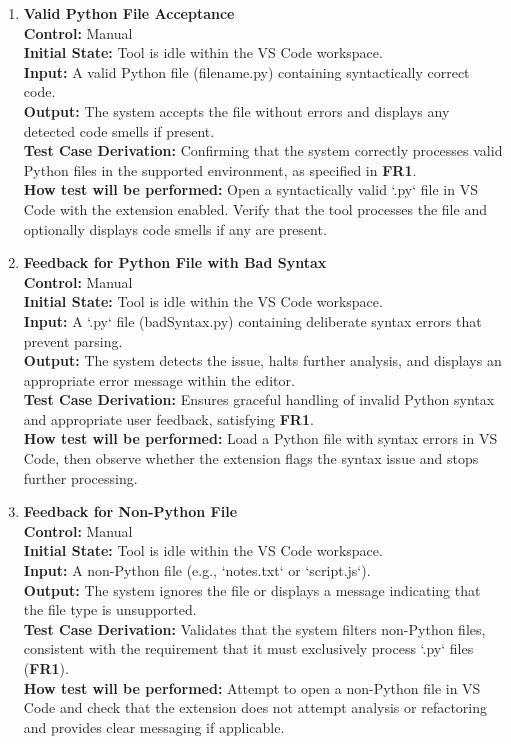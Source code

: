 \documentclass[12pt, titlepage]{article}
\begin{document}
\begin{enumerate}[label={\bf
    \textcolor{Maroon}{test-FR-IA-\arabic*}}, wide=0pt, font=\itshape]
  \item \textbf{Valid Python File Acceptance} \\[2mm]
    \textbf{Control:} Manual \\ 
    \textbf{Initial State:} Tool is idle within the VS Code workspace. \\ 
    \textbf{Input:} A valid Python file (filename.py) containing syntactically correct code. \\ 
    \textbf{Output:} The system accepts the file without errors and displays any detected code smells if present. \\[2mm]
    \textbf{Test Case Derivation:} Confirming that the system
    correctly processes valid Python files in the supported environment, as specified in \textbf{FR1}. \\[2mm]
    \textbf{How test will be performed:} Open a syntactically valid `.py` file in VS Code with the extension enabled. Verify that the tool processes the file and optionally displays code smells if any are present.

  \item \textbf{Feedback for Python File with Bad Syntax} \\[2mm]
    \textbf{Control:} Manual \\ 
    \textbf{Initial State:} Tool is idle within the VS Code workspace. \\ 
    \textbf{Input:} A `.py` file (badSyntax.py) containing deliberate syntax errors that prevent parsing. \\ 
    \textbf{Output:} The system detects the issue, halts further analysis, and displays an appropriate error message within the editor. \\[2mm]
    \textbf{Test Case Derivation:} Ensures graceful handling of invalid Python syntax and appropriate user feedback, satisfying \textbf{FR1}. \\[2mm]
    \textbf{How test will be performed:} Load a Python file with syntax errors in VS Code, then observe whether the extension flags the syntax issue and stops further processing.

  \item \textbf{Feedback for Non-Python File}\\[2mm]
    \textbf{Control:} Manual \\ 
    \textbf{Initial State:} Tool is idle within the VS Code workspace. \\ 
    \textbf{Input:} A non-Python file (e.g., `notes.txt` or `script.js`). \\ 
    \textbf{Output:} The system ignores the file or displays a message indicating that the file type is unsupported. \\[2mm]
    \textbf{Test Case Derivation:} Validates that the system filters non-Python files, consistent with the requirement that it must exclusively process `.py` files (\textbf{FR1}). \\[2mm]
    \textbf{How test will be performed:} Attempt to open a non-Python file in VS Code and check that the extension does not attempt analysis or refactoring and provides clear messaging if applicable.


\end{enumerate}
\end{document}
